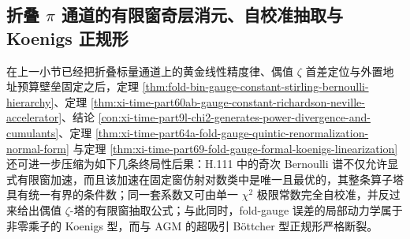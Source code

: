 \subsection{折叠 \texorpdfstring{$\pi$}{pi} 通道的有限窗奇层消元、自校准抽取与 Koenigs 正规形}\label{subsec:conclusion-foldgauge-pi-window-accelerator-zeta-koenigs}
在上一小节已经把折叠标量通道上的黄金线性精度律、偶值 \(\zeta\) 首差定位与外置地址预算壁垒固定之后，定理 \ref{thm:fold-bin-gauge-constant-stirling-bernoulli-hierarchy}、定理 \ref{thm:xi-time-part60ab-gauge-constant-richardson-neville-accelerator}、结论 \ref{con:xi-time-part9l-chi2-generates-power-divergence-and-cumulants}、定理 \ref{thm:xi-time-part64a-fold-gauge-quintic-renormalization-normal-form} 与定理 \ref{thm:xi-time-part69-fold-gauge-formal-koenigs-linearization} 还可进一步压缩为如下几条终局性后果：H.111 中的奇次 Bernoulli 谱不仅允许显式有限窗加速，而且该加速在固定窗仿射对数类中是唯一且最优的，其整条算子塔具有统一有界的条件数；同一套系数又可由单一 \(\chi^2\) 极限常数完全自校准，并反过来给出偶值 \(\zeta\)-塔的有限窗抽取公式；与此同时，fold-gauge 误差的局部动力学属于非零乘子的 Koenigs 型，而与 AGM 的超吸引 B\"ottcher 型正规形严格断裂。

